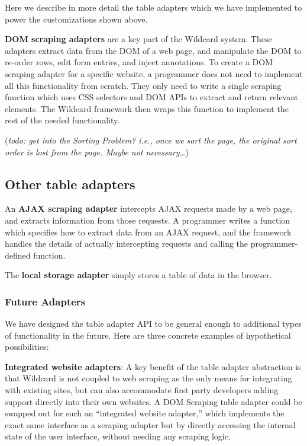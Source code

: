 \documentclass[sigplan,10pt,anonymous,review]{acmart}
\begin{document}
Here we describe in more detail the table adapters which we have
implemented to power the customizations shown above.

\textbf{DOM scraping adapters} are a key part of the Wildcard system.
These adapters extract data from the DOM of a web page, and manipulate
the DOM to re-order rows, edit form entries, and inject annotations. To
create a DOM scraping adapter for a specific website, a programmer does
not need to implement all this functionality from scratch. They only
need to write a single scraping function which uses CSS selectors and
DOM APIs to extract and return relevant elements. The Wildcard framework
then wraps this function to implement the rest of the needed
functionality.

(\emph{todo: get into the Sorting Problem? i.e., once we sort the page,
the original sort order is lost from the page. Maybe not
necessary\ldots{}})

\hypertarget{other-table-adapters}{%
\subsection{Other table adapters}\label{other-table-adapters}}

An \textbf{AJAX scraping adapter} intercepts AJAX requests made by a web
page, and extracts information from those requests. A programmer writes
a function which specifies how to extract data from an AJAX request, and
the framework handles the details of actually intercepting requests and
calling the programmer-defined function.

The \textbf{local storage adapter} simply stores a table of data in the
browser.

\hypertarget{future-adapters}{%
\subsubsection{Future Adapters}\label{future-adapters}}

We have designed the table adapter API to be general enough to
additional types of functionality in the future. Here are three concrete
examples of hypothetical possibilities:

\textbf{Integrated website adapters}: A key benefit of the table adapter
abstraction is that Wildcard is not coupled to web scraping as the only
means for integrating with existing sites, but can also accommodate
first party developers adding support directly into their own websites.
A DOM Scraping table adapter could be swapped out for such an
``integrated website adapter,'' which implements the exact same
interface as a scraping adapter but by directly accessing the internal
state of the user interface, without needing any scraping logic.
\end{document}
